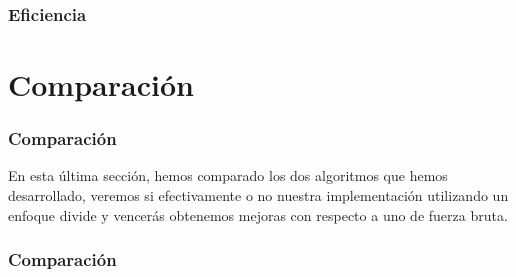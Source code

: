 \documentclass{beamer}
\begin{document}
\begin{frame}
	\frametitle{Eficiencia}
	
	
\end{frame}

\section{Comparación} %
\begin{frame}
	\frametitle{Comparación}
	En esta última sección, hemos comparado los dos algoritmos que hemos desarrollado, veremos si efectivamente o no nuestra implementación utilizando un enfoque divide y vencerás obtenemos mejoras con respecto a uno de fuerza bruta.
	
\end{frame}

\begin{frame}
	\frametitle{Comparación}
	
	
\end{frame}
\end{document}
